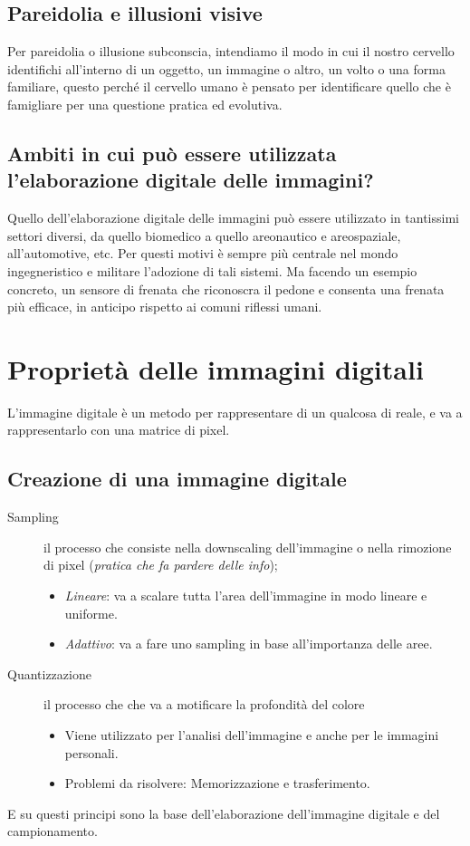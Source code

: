 \documentclass{report}
\begin{document}
\section{Pareidolia e illusioni visive}
\label{sec:pareidolia}
Per pareidolia o illusione subconscia, intendiamo il modo in cui il
nostro cervello identifichi all'interno di un oggetto, un immagine o
altro, un volto o una forma familiare, questo perché il cervello umano
è pensato per identificare quello che è famigliare per una questione
pratica ed evolutiva.

\section{Ambiti in cui può essere utilizzata l'elaborazione digitale
  delle immagini?}
\label{sec:ambito}
Quello dell'elaborazione digitale delle immagini può essere utilizzato in
tantissimi settori diversi, da quello biomedico a quello areonautico e
areospaziale, all'automotive, etc. Per questi motivi è sempre più
centrale nel mondo ingegneristico e militare l'adozione di tali sistemi.
Ma facendo un esempio concreto, un sensore di frenata che riconoscra il
pedone e consenta una frenata più efficace, in anticipo rispetto ai
comuni riflessi umani.

\chapter{Proprietà delle immagini digitali}
\label{chap:propdelimmdig}

L'immagine digitale è un metodo per rappresentare di un qualcosa di
reale, e va a rappresentarlo con una matrice di pixel.

\section{Creazione di una immagine digitale}
\label{sec:creadiunimgdig}

\begin{description}
\item[Sampling] il processo che consiste nella downscaling dell'immagine
  o nella rimozione di pixel (\textit{pratica che fa pardere
    delle info});
  \begin{itemize}
  \item \textit{Lineare}: va a scalare tutta l'area dell'immagine in
    modo lineare e uniforme.
  \item \textit{Adattivo}: va a fare uno sampling in base all'importanza
    delle aree.
  \end{itemize}
\item[Quantizzazione] il processo che che va a motificare la profondità
  del colore
  \begin{itemize}
  \item Viene utilizzato per l'analisi dell'immagine e anche per le
    immagini personali.
  \item Problemi da risolvere: Memorizzazione e trasferimento.
  \end{itemize}
\end{description}
E su questi principi sono la base dell'elaborazione dell'immagine
digitale e del campionamento.
\end{document}
